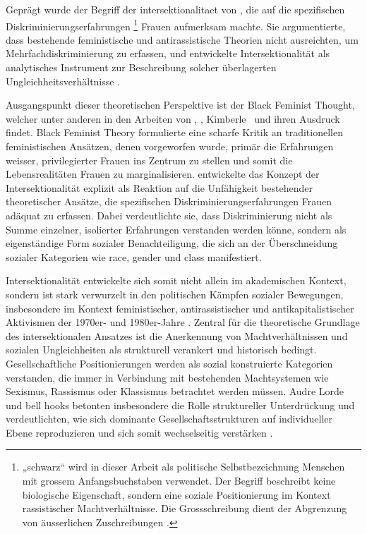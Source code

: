 Geprägt wurde der Begriff der \gls{intersektionalitaet} von \textcite{crenshawMappingMarginsIntersectionality1991}, die auf die spezifischen Diskriminierungserfahrungen \footnote{„\gls{schwarz}“ wird in dieser Arbeit als politische Selbstbezeichnung  Menschen mit grossem Anfangsbuchstaben verwendet. Der Begriff beschreibt keine biologische Eigenschaft, sondern eine soziale Positionierung im Kontext rassistischer Machtverhältnisse. Die Grossschreibung dient der Abgrenzung von äusserlichen Zuschreibungen \parencite{oguntoyeFarbeBekennenAfrodeutsche1986}.} Frauen aufmerksam machte. Sie argumentierte, dass bestehende feministische und antirassistische Theorien nicht ausreichten, um Mehrfachdiskriminierung zu erfassen, und entwickelte Intersektionalität als analytisches Instrument zur Beschreibung solcher überlagerten Ungleichheitsverhältnisse \parencite[\gls{vgl}][]{hancockWhenMultiplicationDoesnt2007}.

Ausgangspunkt dieser theoretischen Perspektive ist der  Black Feminist Thought, welcher unter anderen in den Arbeiten von \textcite{hooksAintWomanBlack1981}, \textcite{lordeSisterOutsiderEssays1984}, Kimberle~\textcite{crenshawMappingMarginsIntersectionality1991} und \textcite{collinsBlackFeministThought2002} ihren Ausdruck findet. Black Feminist Theory formulierte eine scharfe Kritik an traditionellen feministischen Ansätzen, denen vorgeworfen wurde, primär die Erfahrungen weisser, privilegierter Frauen ins Zentrum zu stellen und somit die Lebensrealitäten  Frauen zu marginalisieren. \textcite{crenshawMappingMarginsIntersectionality1991} entwickelte das Konzept der Intersektionalität explizit als Reaktion auf die Unfähigkeit bestehender theoretischer Ansätze, die spezifischen Diskriminierungserfahrungen  Frauen adäquat zu erfassen. Dabei verdeutlichte sie, dass Diskriminierung nicht als Summe einzelner, isolierter Erfahrungen verstanden werden könne, sondern als eigenständige Form sozialer Benachteiligung, die sich an der Überschneidung sozialer Kategorien wie \gls{race}, \gls{gender} und \gls{class} manifestiert.

Intersektionalität entwickelte sich somit nicht allein im akademischen Kontext, sondern ist stark verwurzelt in den politischen Kämpfen sozialer Bewegungen, insbesondere im Kontext feministischer, antirassistischer und antikapitalistischer Aktivismen der 1970er- und 1980er-Jahre \parencite{collinsBlackFeministThought2002}. Zentral für die theoretische Grundlage des intersektionalen Ansatzes ist die Anerkennung von Machtverhältnissen und sozialen Ungleichheiten als strukturell verankert und historisch bedingt. Gesellschaftliche Positionierungen werden als sozial konstruierte Kategorien verstanden, die immer in Verbindung mit bestehenden Machtsystemen wie Sexismus, Rassismus oder Klassismus betrachtet werden müssen. Audre Lorde und bell hooks betonten insbesondere die Rolle struktureller Unterdrückung und verdeutlichten, wie sich dominante Gesellschaftsstrukturen auf individueller Ebene reproduzieren und sich somit wechselseitig verstärken \parencite{collinsBlackFeministThought2002, hancockWhenMultiplicationDoesnt2007}.

